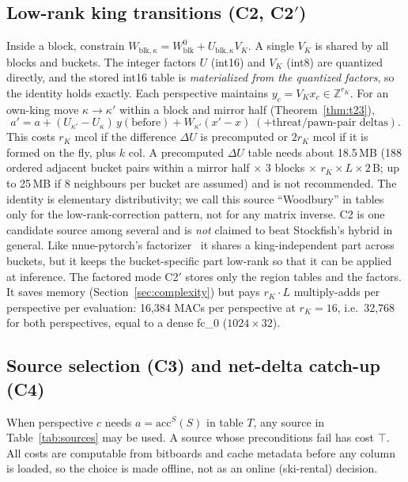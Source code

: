 \documentclass[10pt]{article}
\newcommand{\Z}{\mathbb{Z}}
\newcommand{\accS}{\mathrm{acc}^{S}}
\theoremstyle{plain}
\theoremstyle{definition}
\begin{document}
\subsection{Low-rank king transitions (C2, C2$'$)}

Inside a block, constrain $W_{\mathrm{blk},\kappa}=W^0_{\mathrm{blk}}+U_{\mathrm{blk},\kappa}V_K$.
A single $V_K$ is shared by all blocks and buckets.
The integer factors $U$ (int16) and $V_K$ (int8) are quantized directly, and the stored int16 table is \emph{materialized from the quantized factors}, so the identity holds exactly.
Each perspective maintains $y_c=V_Kx_c\in\Z^{r_K}$.
For an own-king move $\kappa\to\kappa'$ within a block and mirror half (Theorem~\ref{thm:t23}),
\[
a'=a+(U_{\kappa'}-U_\kappa)\,y(\text{before})+W_{\kappa'}(x'-x)\;(+\text{threat/pawn-pair deltas}).
\]
This costs $r_K$ mcol if the difference $\Delta U$ is precomputed or $2r_K$ mcol if it is formed on the fly, plus $k$ col.
A precomputed $\Delta U$ table needs about 18.5\,MB (188 ordered adjacent bucket pairs within a mirror half $\times$ 3 blocks $\times$ $r_K\times L\times2$\,B; up to 25\,MB if 8 neighbours per bucket are assumed) and is not recommended.
The identity is elementary distributivity; we call this source ``Woodbury'' in tables only for the low-rank-correction pattern, not for any matrix inverse.
C2 is one candidate source among several and is \emph{not} claimed to beat Stockfish's hybrid in general.
Like nnue-pytorch's factorizer~\cite{nnuepytorchdocs} it shares a king-independent part across buckets, but it keeps the bucket-specific part low-rank so that it can be applied at inference.
The factored mode C2$'$ stores only the region tables and the factors.
It saves memory (Section~\ref{sec:complexity}) but pays $r_K\cdot L$ multiply-adds per perspective per evaluation: 16,384 MACs per perspective at $r_K=16$, i.e.\ 32,768 for both perspectives, equal to a dense fc\_0 ($1024\times32$).


\subsection{Source selection (C3) and net-delta catch-up (C4)}

When perspective $c$ needs $a=\accS(S)$ in table $T$, any source in Table~\ref{tab:sources} may be used.
A source whose preconditions fail has cost $\top$.
All costs are computable from bitboards and cache metadata before any column is loaded, so the choice is made offline, not as an online (ski-rental) decision.
\end{document}
